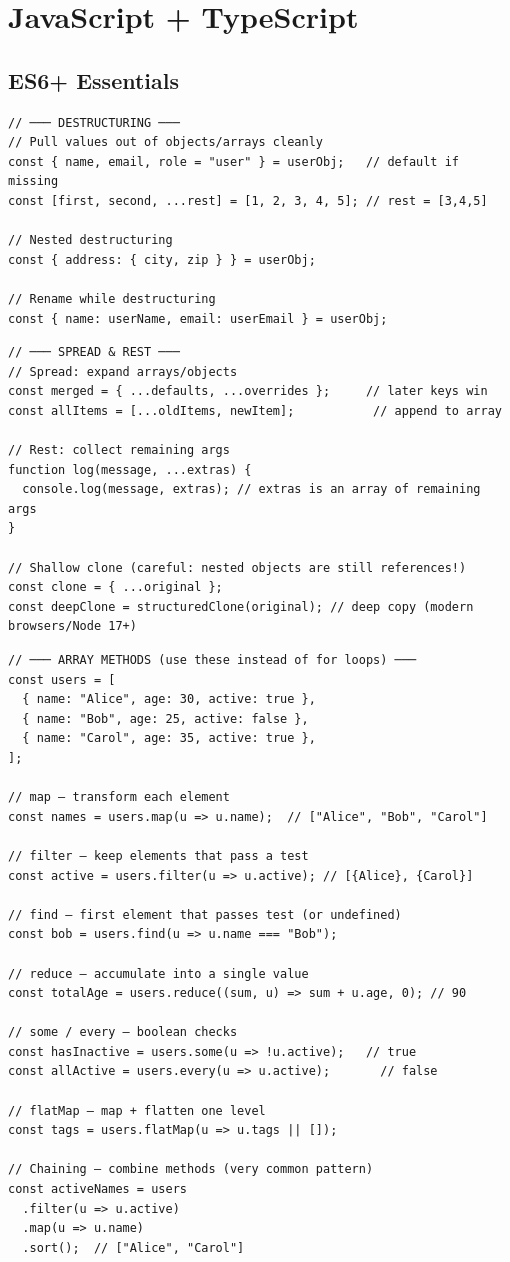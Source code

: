 \documentclass[10pt, a4paper]{article}
\begin{document}
\bigskip


\section{JavaScript + TypeScript}


\subsection{ES6+ Essentials}


\begin{lstlisting}[language=myjs]
// ─── DESTRUCTURING ───
// Pull values out of objects/arrays cleanly
const { name, email, role = "user" } = userObj;   // default if missing
const [first, second, ...rest] = [1, 2, 3, 4, 5]; // rest = [3,4,5]

// Nested destructuring
const { address: { city, zip } } = userObj;

// Rename while destructuring
const { name: userName, email: userEmail } = userObj;
\end{lstlisting}


\begin{lstlisting}[language=myjs]
// ─── SPREAD & REST ───
// Spread: expand arrays/objects
const merged = { ...defaults, ...overrides };     // later keys win
const allItems = [...oldItems, newItem];           // append to array

// Rest: collect remaining args
function log(message, ...extras) {
  console.log(message, extras); // extras is an array of remaining args
}

// Shallow clone (careful: nested objects are still references!)
const clone = { ...original };
const deepClone = structuredClone(original); // deep copy (modern browsers/Node 17+)
\end{lstlisting}


\begin{lstlisting}[language=myjs]
// ─── ARRAY METHODS (use these instead of for loops) ───
const users = [
  { name: "Alice", age: 30, active: true },
  { name: "Bob", age: 25, active: false },
  { name: "Carol", age: 35, active: true },
];

// map — transform each element
const names = users.map(u => u.name);  // ["Alice", "Bob", "Carol"]

// filter — keep elements that pass a test
const active = users.filter(u => u.active); // [{Alice}, {Carol}]

// find — first element that passes test (or undefined)
const bob = users.find(u => u.name === "Bob");

// reduce — accumulate into a single value
const totalAge = users.reduce((sum, u) => sum + u.age, 0); // 90

// some / every — boolean checks
const hasInactive = users.some(u => !u.active);   // true
const allActive = users.every(u => u.active);       // false

// flatMap — map + flatten one level
const tags = users.flatMap(u => u.tags || []);

// Chaining — combine methods (very common pattern)
const activeNames = users
  .filter(u => u.active)
  .map(u => u.name)
  .sort();  // ["Alice", "Carol"]
\end{lstlisting}
\end{document}
